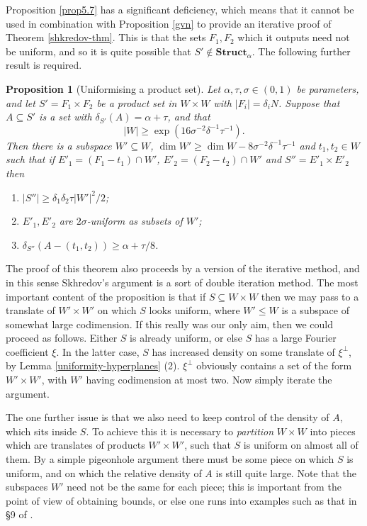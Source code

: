 \documentclass[12pt,a4paper,reqno]{amsart}
\numberwithin{equation}{section}
\theoremstyle{plain}
\newtheorem{proposition}[subsection]{Proposition}
\theoremstyle{definition}
\renewcommand{\leq}{\leqslant}
\renewcommand{\geq}{\geqslant}
\begin{document}
\noindent Proposition \ref{prop5.7} has a significant deficiency, which means that it cannot be used in combination with Proposition \ref{gvn} to provide an iterative proof of Theorem \ref{shkredov-thm}. This is that the sets $F_1,F_2$ which it outputs need not be uniform, and so it is quite possible that $S' \notin \mathbf{Struct}_{\alpha}$. The following further result is required.

\begin{proposition}[Uniformising a product set]\label{prop5.8}
Let $\alpha,\tau,\sigma \in (0,1)$ be parameters, and let $S' = F_1 \times F_2$ be a product set in $W \times W$ with $|F_i| = \delta_i N$. Suppose that $A \subseteq S'$ is a set with $\delta_{S'}(A) = \alpha + \tau$, and that
\begin{equation}\label{M-cond}
|W| \geq \exp(16 \sigma^{-2}\delta^{-1}\tau^{-1}).
\end{equation}
Then there is a subspace $W' \subseteq W$, $\dim W' \geq \dim W - 8\sigma^{-2}\delta^{-1}\tau^{-1}$ and $t_1,t_2 \in W$ such that if $E'_1 = (F_1 - t_1) \cap W'$, $E'_2 = (F_2 - t_2) \cap W'$ and $S'' = E'_1 \times E'_2$ then
\begin{enumerate}
\item $|S''| \geq \delta_1\delta_2 \tau |W'|^2/2$;
\item $E'_1, E'_2$ are $2\sigma$-uniform as subsets of $W'$;
\item $\delta_{S''}(A - (t_1,t_2)) \geq \alpha + \tau/8$.
\end{enumerate}
\end{proposition}
\noindent The proof of this theorem also proceeds by a version of the iterative method, and in this sense Skhredov's argument is a sort of double iteration method. The most important content of the proposition is that if $S \subseteq W \times W$ then we may pass to a translate of $W' \times W'$ on which $S$ looks uniform, where $W' \leq W$ is a subspace of somewhat large codimension. If this really was our only aim, then we could proceed as follows. Either $S$ is already uniform, or else $S$ has a large Fourier coefficient $\xi$. In the latter case, $S$ has increased density on some translate of $\xi^{\perp}$, by Lemma \ref{uniformity-hyperplanes} (2). $\xi^{\perp}$ obviously contains a set of the form $W' \times W'$, with $W'$ having codimension at most two. Now simply iterate the argument. \vspace{11pt}

\noindent The one further issue is that we also need to keep control of the density of $A$, which sits inside $S$. To achieve this it is necessary to \textit{partition} $W \times W$ into pieces which are translates of products $W' \times W'$, such that $S$ is uniform on almost all of them. By a simple pigeonhole argument there must be some piece on which $S$ is uniform, and on which the relative density of $A$ is still quite large. Note that the subspaces $W'$ need not be the same for each piece; this is important from the point of view of obtaining bounds, or else one runs into examples such as that in \S 9 of \cite{green-reg}.\vspace{11pt}
\end{document}

